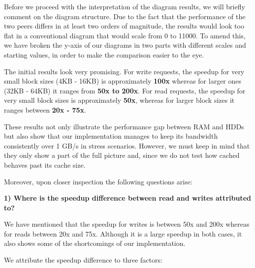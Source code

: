 Before we proceed with the interpretation of the diagram results, we will 
briefly comment on the diagram structure. Due to the fact that the performance 
of the two peers differs in at least two orders of magnitude, the results would 
look too flat in a conventional diagram that would scale from 0 to 11000. To 
amend this, we have broken the y-axis of our diagrams in two parts with 
different scales and starting values, in order to make the comparison easier to 
the eye.


The initial results look very promising. For write requests, the speedup for 
very small block sizes (4KB - 16KB) is approximately \textbf{100x} whereas for 
larger ones (32KB - 64KB) it ranges from \textbf{50x to 200x}. For read 
requests, the speedup for very small block sizes is approximately \textbf{50x}, 
whereas for larger block sizes it ranges between \textbf{20x - 75x}.

These results not only illustrate the performance gap between RAM and
HDDs but also show that our implementation manages to keep its bandwidth 
consistently over 1 GB/s in stress scenarios. However, we must keep in mind 
that they only show a part of the full picture and, since we do not test how 
cached behaves past its cache size.

Moreover, upon closer inspection the following questions arise:

\textbf{1) Where is the speedup difference between read and writes attributed 
	to?}

We have mentioned that the speedup for writes is between 50x and 200x whereas 
for reads between 20x and 75x. Although it is a large speedup in both cases, it 
also shows some of the shortcomings of our implementation.

We attribute the speedup difference to three factors:

